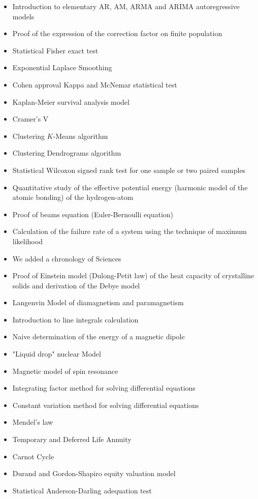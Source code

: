 \documentclass[12pt,a4paper,twoside,openright]{report}
\theoremstyle{definition}
\theoremstyle{itexmp}
\numberwithin{equation}{section}
\begin{document}
\begin{itemize}
\begin{itemize}[noitemsep]
			\item Introduction to elementary  AR, AM, ARMA and ARIMA autoregressive models
			\item Proof of the expression of the correction factor on finite population
			\item Statistical Fisher exact test
			\item Exponential Laplace Smoothing
			\item Cohen approval Kappa and McNemar statistical test
			\item Kaplan-Meier survival analysis model
			\item Cramer's V
			\item Clustering $K$-Means algorithm
			\item Clustering Dendrograms algorithm
			\item Statistical Wilcoxon signed rank test for one sample or two paired samples
			\item Quantitative study of the effective potential energy (harmonic model of the atomic bonding) of the hydrogen-atom
			\item Proof of beams equation (Euler-Bernoulli equation)
			\item Calculation of the failure rate of a system using the technique of maximum likelihood
			\item We added a chronology of Sciences
			\item Proof of Einstein model (Dulong-Petit law) of the heat capacity of crystalline solids and derivation of the Debye model
			\item Langenvin Model of diamagnetism and paramagnetism
			\item Introduction to line integrals calculation
			\item Naive determination of the energy of a magnetic dipole
			\item "Liquid drop" nuclear Model 
			\item Magnetic model of spin resonance
			\item Integrating factor method for solving differential equations
			\item Constant variation method for solving differential equations
			\item Mendel's law
			\item Temporary and Deferred Life Annuity
			\item Carnot Cycle
			\item Durand and Gordon-Shapiro equity valuation model 
			\item Statistical Anderson-Darling adequation test

\end{itemize}
\end{itemize}
\end{document}
